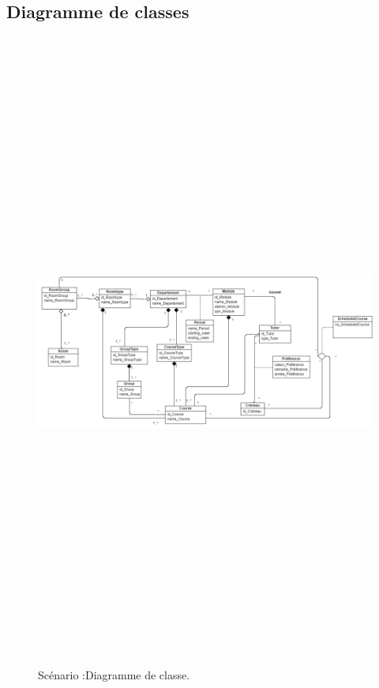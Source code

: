 \subsection{Diagramme de classes}
 \begin{figure}[!htb]
      \centering
        \includegraphics[width=17cm,height=21cm]{img/ClassDiagramm.png}
        \caption{Scénario :Diagramme de classe. }
    \end{figure}
\newpage

\\
